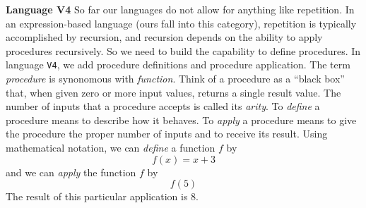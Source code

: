 \begin{minipage}[t]{\sw}
\slidenumber
\LARGE
{\bf Language V4}\exx
So far our languages do not allow for anything like repetition.
In an expression-based language (ours fall into this category),
repetition is typically accomplished by recursion,
and recursion depends on the ability to apply procedures recursively.
So we need to build the capability to define procedures.\exx
In language \verb'V4', we add procedure definitions
and procedure application.
The term {\em procedure} is synonomous with {\em function}.\exx
Think of a procedure as a ``black box''
that, when given zero or more input values,
returns a single result value.
The number of inputs that a procedure accepts is called its {\em arity}.\exx
To {\em define} a procedure means
to describe how it behaves.
To {\em apply} a procedure means
to give the procedure the proper number of inputs
and to receive its result.\exx
Using mathematical notation, we can {\em define} a function $f$ by
{\Large\[f(x) = x+3\]}
and we can {\em apply} the function $f$ by
{\Large\[f(5)\]}
The result of this particular application is $8$.
\end{minipage}

